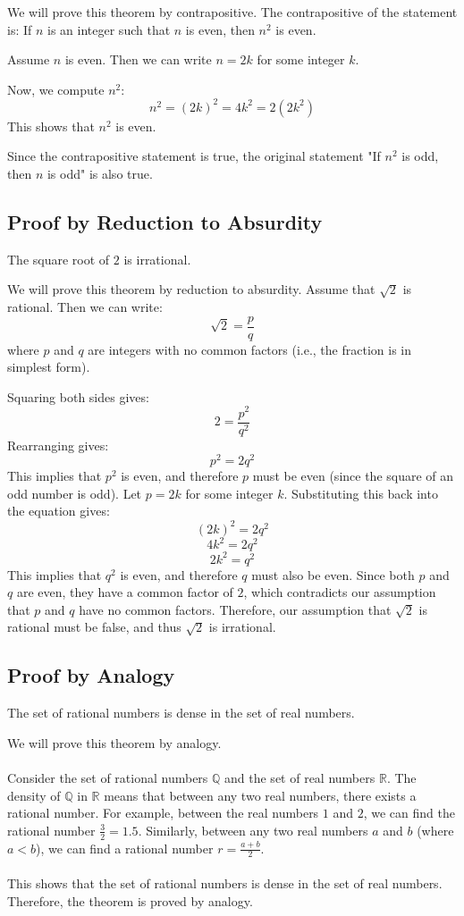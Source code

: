 	We will prove this theorem by contrapositive. The contrapositive of the statement is: If \( n \) is an integer such that \( n \) is even, then \( n^2 \) is even.

	Assume \( n \) is even. Then we can write \( n = 2k \) for some integer \( k \).

	Now, we compute \( n^2 \):
	\[
		n^2 = (2k)^2 = 4k^2 = 2(2k^2)
	\]
	This shows that \( n^2 \) is even.

	Since the contrapositive statement is true, the original statement "If \( n^2 \) is odd, then \( n \) is odd" is also true.

\QED

\subsection{Proof by Reduction to Absurdity}

The square root of \( 2 \) is irrational.


	We will prove this theorem by reduction to absurdity. Assume that \( \sqrt{2} \) is rational. Then we can write:
	\[
		\sqrt{2} = \frac{p}{q}
	\]
	where \( p \) and \( q \) are integers with no common factors (i.e., the fraction is in simplest form).

	Squaring both sides gives:
	\[
		2 = \frac{p^2}{q^2}
	\]
	Rearranging gives:
	\[
		p^2 = 2q^2
	\]
	This implies that \( p^2 \) is even, and therefore \( p \) must be even (since the square of an odd number is odd).
	Let \( p = 2k \) for some integer \( k \). Substituting this back into the equation gives:
	\[
		(2k)^2 = 2q^2
	\]
	\[
		4k^2 = 2q^2
	\]
	\[
		2k^2 = q^2
	\]
	This implies that \( q^2 \) is even, and therefore \( q \) must also be even.
	Since both \( p \) and \( q \) are even, they have a common factor of \( 2 \), which contradicts our assumption that \( p \) and \( q \) have no common factors.
	Therefore, our assumption that \( \sqrt{2} \) is rational must be false, and thus \( \sqrt{2} \) is irrational.

\QED

\subsection{Proof by Analogy}

The set of rational numbers is dense in the set of real numbers.

We will prove this theorem by analogy.
\\\\	
Consider the set of rational numbers \( \mathbb{Q} \) and the set of real numbers \( \mathbb{R} \). The density of \( \mathbb{Q} \) in \( \mathbb{R} \) means that between any two real numbers, there exists a rational number.
For example, between the real numbers \( 1 \) and \( 2 \), we can find the rational number \( \frac{3}{2} = 1.5 \). Similarly, between any two real numbers \( a \) and \( b \) (where \( a < b \)), we can find a rational number \( r = \frac{a + b}{2} \).
\\\\
This shows that the set of rational numbers is dense in the set of real numbers.
Therefore, the theorem is proved by analogy.

\QED
\newpage


